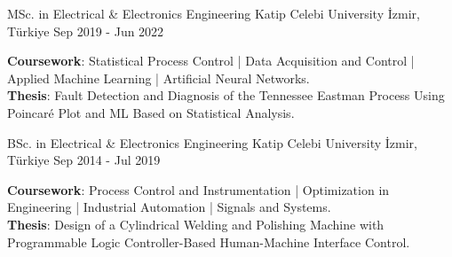 

\begin{cventries}

  \cventry
    {MSc. in Electrical \& Electronics Engineering} %
    {Katip Celebi University} %
    {İzmir, Türkiye} %
    {Sep 2019 - Jun 2022} %
    {
      \begin{cvitems} %
        \textbf{Coursework}: Statistical Process Control | Data Acquisition and Control | Applied Machine Learning | Artificial Neural Networks.\\
        \textbf{Thesis}: Fault Detection and Diagnosis of the Tennessee Eastman Process Using Poincaré Plot and ML Based on Statistical Analysis.
      \end{cvitems}
    }

  \cventry
    {BSc. in Electrical \& Electronics Engineering} %
    {Katip Celebi University} %
    {İzmir, Türkiye} %
    {Sep 2014 - Jul 2019} %
    {
      \begin{cvitems} %
        \textbf{Coursework}: Process Control and Instrumentation | Optimization in Engineering | Industrial Automation | Signals and Systems.\\
        \textbf{Thesis}: Design of a Cylindrical Welding and Polishing Machine with Programmable Logic Controller-Based Human-Machine Interface Control.
      \end{cvitems}
    }

\end{cventries}
